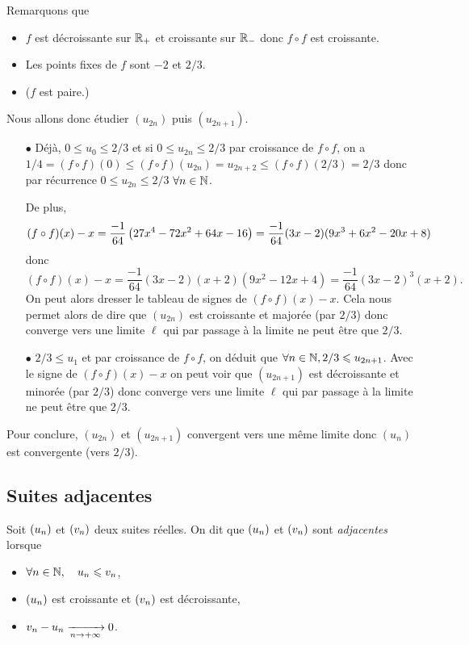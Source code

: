 \documentclass{magnoliaold}
\begin{document}
\begin{sol}
Remarquons que 
\begin{itemize}
\item $f$ est décroissante sur $\mathbb{R}_+$ et croissante sur $\mathbb{R}_-$ donc $f\circ f$ est croissante.
\item Les points fixes de $f$ sont $-2$ et $2/3$.
\item ($f$ est paire.)
\end{itemize}
Nous allons donc étudier $(u_{2n})$ puis $(u_{2n+1})$.
\begin{itemize}
\item[$\bullet$] Déjà, $0\leq u_0\leq 2/3$ et si $0\leq u_{2n} \leq 2/3$ par croissance de $f\circ f$, on a $1/4=(f\circ f)(0)\leq (f\circ f)(u_{2n})=u_{2n+2} \leq (f\circ f)(2/3)=2/3$ donc par récurrence $0\leq u_{2n} \leq 2/3$ $\forall n \in \mathbb{N}$. 

De plus, $$(f\circ f)(x)-x=\frac{-1}{64}\left(27x^4-72x^2+64x-16\right)=\frac{-1}{64}(3x-2)(9x^3+6x^2-20x+8)$$ donc $$(f\circ f)(x)-x=\frac{-1}{64}(3x-2)(x+2)(9x^2-12x+4)=\frac{-1}{64}(3x-2)^3(x+2).$$
On peut alors dresser le tableau de signes de $(f\circ f)(x)-x$. Cela nous permet alors de dire que $(u_{2n})$ est croissante et majorée (par $2/3$) donc converge vers une limite $\ell$ qui par passage à la limite ne peut être que $2/3$.

\item[$\bullet$] $2/3\leq u_1 $ et par croissance de $f\circ f$, on déduit que $\forall n \in \mathbb{N}, 2/3\leqslant u_{2n+1}$. Avec le signe de $(f\circ f)(x)-x$ on peut voir que $(u_{2n+1})$ est décroissante et minorée (par $2/3$) donc converge vers une limite $\ell$ qui par passage à la limite ne peut être que $2/3$.

\end{itemize}

Pour conclure, $(u_{2n})$ et $(u_{2n+1})$ convergent vers une même limite donc $(u_n)$ est convergente (vers $2/3$).
\end{sol}

\subsection{Suites adjacentes}

\begin{definition}[utile=-3]
Soit $\left(u_n\right)$ et $\left(v_n\right)$ deux suites réelles. On dit que $\left(u_n\right)$ et
$\left(v_n\right)$ sont \emph{adjacentes} lorsque
\begin{itemize}
\item $\forall n\in\mathbb{N} ,\quad u_n \leqslant v_n$,
\item $\left(u_n\right)$ est croissante et $\left(v_n\right)$ est décroissante,
\item $v_n-u_n \xrightarrow[n\rightarrow +\infty]{} 0$.
\end{itemize}
\end{definition}
\end{document}
